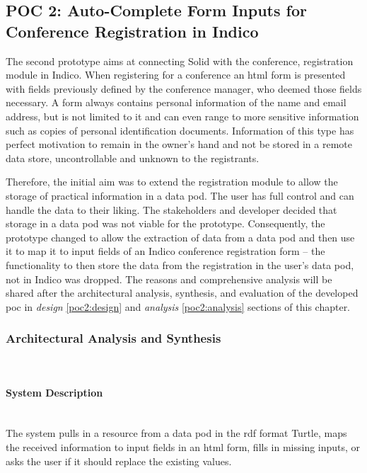 \subsection{POC 2: Auto-Complete Form Inputs for Conference Registration in Indico}

The second prototype aims at connecting Solid with the conference, registration module in Indico. When registering for a conference an \gls{html} form is presented with fields previously defined by the conference manager, who deemed those fields necessary. A form always contains personal information of the name and email address, but is not limited to it and can even range to more sensitive information such as copies of personal identification documents. Information of this type has perfect motivation to remain in the owner's hand and not be stored in a remote data store, uncontrollable and unknown to the registrants.

Therefore, the initial aim was to extend the registration module to allow the storage of practical information in a data pod. The user has full control and can handle the data to their liking. The stakeholders and developer decided that storage in a data pod was not viable for the prototype. Consequently, the prototype changed to allow the extraction of data from a data pod and then use it to map it to input fields of an Indico conference registration form -- the functionality to then store the data from the registration in the user's data pod, not in Indico was dropped. The reasons and comprehensive analysis will be shared after the architectural analysis, synthesis, and evaluation of the developed \gls{poc} in \textit{design} \ref{poc2:design} and \textit{analysis} \ref{poc2:analysis} sections of this chapter.

\subsubsection{Architectural Analysis and Synthesis}\mbox{}\\

\paragraph{System Description}\mbox{}\\

The system pulls in a resource from a data pod in the \gls{rdf} format Turtle, maps the received information to input fields in an \gls{html} form, fills in missing inputs, or asks the user if it should replace the existing values.

